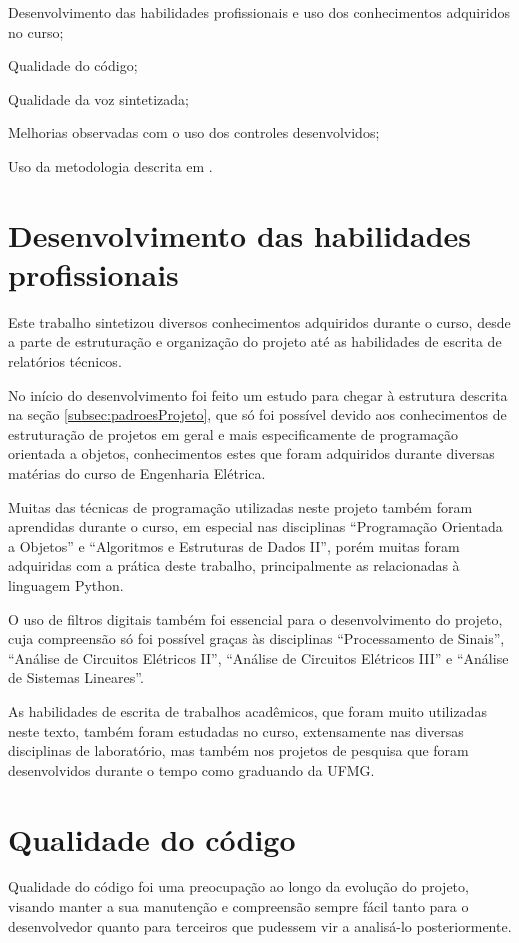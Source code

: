 \documentclass[
  12pt,       
  openright,      
  twoside,      
  a4paper,      
  english,      
  french,       
  spanish,      
  brazil,     
  ]{abntex2}
\begin{document}
\begin{alineas}
\item Desenvolvimento das habilidades profissionais e uso dos conhecimentos adquiridos no curso;
\item Qualidade do código;
\item Qualidade da voz sintetizada;
\item Melhorias observadas com o uso dos controles desenvolvidos;
\item Uso da metodologia descrita em .
\end{alineas}

\section{Desenvolvimento das habilidades profissionais}
Este trabalho sintetizou diversos conhecimentos adquiridos durante o curso, desde a parte de estruturação e organização do projeto até as habilidades de escrita de relatórios técnicos.

No início do desenvolvimento foi feito um estudo para chegar à estrutura descrita na seção \ref{subsec:padroesProjeto}, que só foi possível devido aos conhecimentos de estruturação de projetos em geral e mais especificamente de programação orientada a objetos, conhecimentos estes que foram adquiridos durante diversas matérias do curso de Engenharia Elétrica.

Muitas das técnicas de programação utilizadas neste projeto também foram aprendidas durante o curso, em especial nas disciplinas ``Programação Orientada a Objetos'' e ``Algoritmos e Estruturas de Dados II'', porém muitas foram adquiridas com a prática deste trabalho, principalmente as relacionadas à linguagem Python.

O uso de filtros digitais também foi essencial para o desenvolvimento do projeto, cuja compreensão só foi possível graças às disciplinas ``Processamento de Sinais'', ``Análise de Circuitos Elétricos II'', ``Análise de Circuitos Elétricos III'' e ``Análise de Sistemas Lineares''.

As habilidades de escrita de trabalhos acadêmicos, que foram muito utilizadas neste texto, também foram estudadas no curso, extensamente nas diversas disciplinas de laboratório, mas também nos projetos de pesquisa que foram desenvolvidos durante o tempo como graduando da UFMG.

\section{Qualidade do código}
Qualidade do código foi uma preocupação ao longo da evolução do projeto, visando manter a sua manutenção e compreensão sempre fácil tanto para o desenvolvedor quanto para terceiros que pudessem vir a analisá-lo posteriormente.
\end{document}
